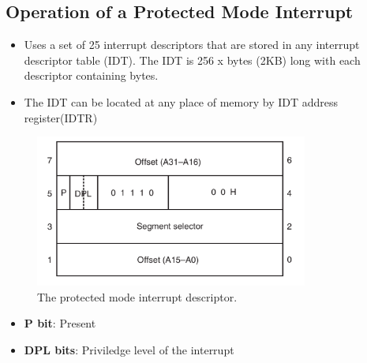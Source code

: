 \subsection{Operation of a Protected Mode Interrupt}
\begin{itemize}
  \item Uses a set of 25 interrupt descriptors that are stored in any interrupt descriptor table (IDT). The IDT is 256 x  bytes (2KB) long with each descriptor containing  bytes.
  \item The IDT can be located at any place of memory by IDT address register(IDTR)
\end{itemize}

\begin{figure}[h!]
  \includegraphics[width = 0.8\textwidth]{./figures/IDT.png}
  \caption{The protected mode interrupt descriptor.}
\end{figure}

\begin{itemize}
  \item \textbf{P bit}: Present
  \item \textbf{DPL bits}: Priviledge level of the interrupt

\end{itemize}
